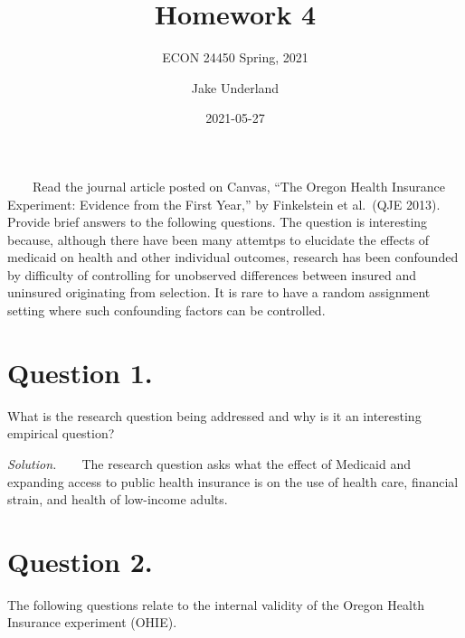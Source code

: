 \documentclass[
]{article}
\title{Homework 4}
\subtitle{ECON 24450 Spring, 2021}
\author{Jake Underland}
\date{2021-05-27}
\begin{document}
\maketitle

{
\setcounter{tocdepth}{1}
\tableofcontents
}
~~~~Read the journal article posted on Canvas, ``The Oregon Health
Insurance Experiment: Evidence from the First Year,'' by Finkelstein et
al.~(QJE 2013). Provide brief answers to the following questions. The
question is interesting because, although there have been many attemtps
to elucidate the effects of medicaid on health and other individual
outcomes, research has been confounded by difficulty of controlling for
unobserved differences between insured and uninsured originating from
selection. It is rare to have a random assignment setting where such
confounding factors can be controlled.

\hypertarget{question-1.}{%
\section{Question 1.}\label{question-1.}}

What is the research question being addressed and why is it an
interesting empirical question?

\textit{Solution.}\newline ~~~~The research question asks what the
effect of Medicaid and expanding access to public health insurance is on
the use of health care, financial strain, and health of low-income
adults.

\hypertarget{question-2.}{%
\section{Question 2.}\label{question-2.}}

The following questions relate to the internal validity of the Oregon
Health Insurance experiment (OHIE).
\end{document}
